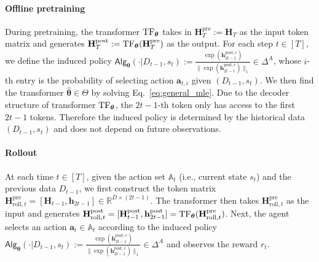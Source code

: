 \documentclass[10pt]{article}
\newcommand{\<}{\left\langle}
\renewcommand{\>}{\right\rangle}
\newcommand{\TF}{{\rm TF}}
\newcommand{\R}{\mathbb{R}}
\newcommand{\pre}{{\mathrm{pre}}}
\newcommand{\post}{{\mathrm{post}}}
\newcommand{\partc}{{c}}
\newcommand{\state}{{s}}
\newcommand{\totlen}{{T}}
\newcommand{\sAlg}{{\mathsf{Alg}}}
\newcommand{\dset}{{D}}
\newcommand{\esttfpar}{{\widehat{\btheta}}}
\newcommand{\tfpar}{{\btheta}}
\newcommand{\tfparspace}{{\Theta}}
\newcommand{\roll}{{\mathrm{roll}}}
\def\sA{{\mathbb{A}}}
\def\bH{{\mathbf H}}
\def\btheta{{\boldsymbol \theta}}
\def\ba{{\mathbf a}}
\def\bh{{\mathbf h}}
\begin{document}
\paragraph{Offline pretraining} 
During pretraining, the transformer $\TF_\tfpar$ takes in   $\bH_\totlen^\pre:=\bH_\totlen$ as the input token matrix and generates $\bH_\totlen^\post:=\TF_\tfpar(\bH_\totlen^\pre)$ as the output. For each step $t\in[\totlen]$, we define the  induced policy  $\sAlg_\tfpar(\cdot|\dset_{t-1},\state_t):=\frac{\exp(\bh^{\post,\partc}_{2t-1})}{\|\exp(\bh^{\post,\partc}_{2t-1})\|_1}\in\Delta^A$, whose $i$-th entry is the probability of selecting action $\ba_{t,i}$ given $(\dset_{t-1},\state_t)$. We then find the transformer $\esttfpar\in\tfparspace$ by solving Eq.~\eqref{eq:general_mle}. 
Due to the decoder structure of transformer $\TF_\tfpar$, the $2t-1$-th token only has access to the first $2t-1$ tokens. Therefore the induced policy is  determined by the historical data $(\dset_{t-1},\state_t)$ and does not depend on future observations. 
\paragraph{Rollout}
At each time $t\in[\totlen]$, given the action set $\sA_t$ (i.e., current state $\state_t$) and the previous data $\dset_{t-1}$, we first construct the token matrix $\bH^{\pre}_{\roll,t}=[\bH_{t-1},\bh_{2t-1}]\in\R^{D\times (2t-1)}$.   The transformer then takes $\bH^{\pre}_{\roll,t}$ as the input  and generates $\bH^{\post}_{\roll,t}=[\bH^{\post}_{t-1},\bh^{\post}_{2t-1}]=\TF_\tfpar(\bH^{\pre}_{\roll,t})$. Next,  the agent selects an action $\ba_t\in\sA_t$ according to the induced  policy $\sAlg_\tfpar(\cdot|\dset_{t-1},\state_t):=\frac{\exp(\bh^{\post,\partc}_{2t-1})}{\|\exp(\bh^{\post,\partc}_{2t-1})\|_1}\in\Delta^A$ and observes the reward $r_t$.
\end{document}
